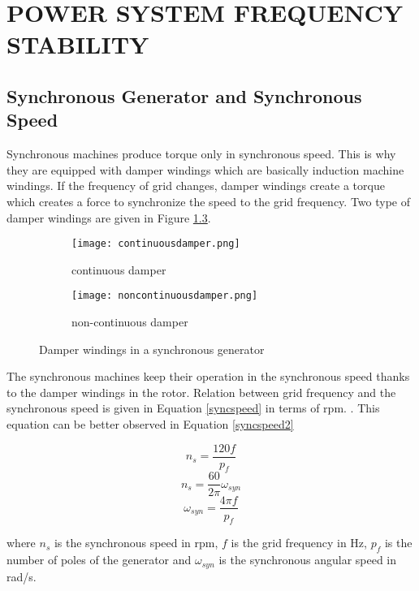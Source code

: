 \chapter{POWER SYSTEM FREQUENCY STABILITY}
\label{chp:2}
\section{Synchronous Generator and Synchronous Speed}

Synchronous machines produce torque only in synchronous speed. This is why they are equipped with damper windings which are basically induction machine windings. If the frequency of  grid changes, damper windings create a torque which creates a force to synchronize the speed to the grid frequency. Two type of damper windings are given in Figure \ref{damperwindings}.

\begin{figure}[h!]
	\centering
	\begin{subfigure}{.5\textwidth}
		\centering
		\texttt{[image: continuousdamper.png]}
		\caption{continuous damper}
		\label{continuousdamper}
	\end{subfigure}%
	\begin{subfigure}{.5\textwidth}
		\centering
		\texttt{[image: noncontinuousdamper.png]}
		\caption{non-continuous damper}
		\label{noncontinuousdamper}
	\end{subfigure}
	\caption{Damper windings in a synchronous generator \cite{Kundur}}
	\label{damperwindings}
\end{figure}

The synchronous machines keep their operation in the synchronous speed thanks to the damper windings in the rotor. Relation between grid frequency and the synchronous speed is given in Equation \ref{syncspeed} in terms of rpm. \cite{Kundur}. This equation can be better observed in Equation \ref{syncspeed2}

\begin{equation}
 n_{s}=\frac{120f}{p_{f}}
 \label{syncspeed}
\end{equation}
\begin{equation}
 n_{s}=\frac{60}{2\pi}\omega_{syn}
\end{equation}
\begin{equation}
\omega_{syn}=\frac{4\pi f}{p_{f}}
\label{syncspeed2}
\end{equation}

where $n_{s}$ is the synchronous speed in rpm, $f$ is the grid frequency in Hz, $p_{f}$ is the number of poles of the generator and $\omega_{syn}$ is the synchronous angular speed in rad/s.

